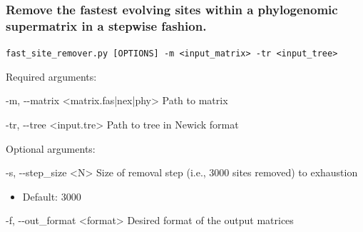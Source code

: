\documentclass{article}
\def\code#1{\texttt{#1}}
\begin{document}
        \vspace{0.5cm}
        
        \subsubsection{Remove the fastest evolving sites within a phylogenomic supermatrix in a stepwise fashion.}
        \begin{description}
        
            \vspace{0.2cm}
            \item \code{fast\_site\_remover.py [OPTIONS] -m <input\_matrix> -tr <input\_tree>}
            \vspace{0.2cm}
            
            \begin{description}
                \item  Required arguments:
                \begin{description}
                    \item  -m, -\/-matrix \hspace{0.2cm} <matrix.fas|nex|phy> \hspace{0.2cm} Path to matrix
                    \item -tr, -\/-tree	\hspace{0.2cm} <input.tre> Path to tree in Newick format
                \end{description}
            \end{description}
            \vspace{0.2cm}
            \begin{description}
                \item Optional arguments:
                \begin{description}
                    \item -s, -\/-step\_size \hspace{0.2cm} <N> \hspace{0.2cm} Size of removal step (i.e., 3000 sites removed) to exhaustion
                    \begin{itemize}
                        \item Default: 3000
                    \end{itemize}
                    \item -f, -\/-out\_format \hspace{0.2cm} <format> \hspace{0.2cm} Desired format of the output matrices

\end{description}
\end{description}
\end{description}
\end{document}
